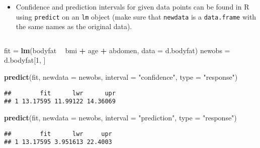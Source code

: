 \documentclass[10pt,ignorenonframetext,]{beamer}
\newenvironment{Shaded}{\begin{snugshade}}{\end{snugshade}}
\newcommand{\DataTypeTok}[1]{\textcolor[rgb]{0.13,0.29,0.53}{#1}}
\newcommand{\DecValTok}[1]{\textcolor[rgb]{0.00,0.00,0.81}{#1}}
\newcommand{\KeywordTok}[1]{\textcolor[rgb]{0.13,0.29,0.53}{\textbf{#1}}}
\newcommand{\NormalTok}[1]{#1}
\newcommand{\OperatorTok}[1]{\textcolor[rgb]{0.81,0.36,0.00}{\textbf{#1}}}
\newcommand{\StringTok}[1]{\textcolor[rgb]{0.31,0.60,0.02}{#1}}
\providecommand{\tightlist}{%
  \setlength{\itemsep}{0pt}\setlength{\parskip}{0pt}}
\begin{document}
\begin{frame}[fragile]

\begin{itemize}
\tightlist
\item
  Confidence and prediction intervals for given data points can be found
  in R using \texttt{predict} on an \texttt{lm} object (make sure that
  \texttt{newdata} is a \texttt{data.frame} with the same names as the
  original data).
\end{itemize}

\(~\)

\scriptsize

\begin{Shaded}
\begin{Highlighting}[]
\NormalTok{fit =}\StringTok{ }\KeywordTok{lm}\NormalTok{(bodyfat }\OperatorTok{~}\StringTok{ }\NormalTok{bmi }\OperatorTok{+}\StringTok{ }\NormalTok{age }\OperatorTok{+}\StringTok{ }\NormalTok{abdomen, }\DataTypeTok{data =}\NormalTok{ d.bodyfat)}
\NormalTok{newobs =}\StringTok{ }\NormalTok{d.bodyfat[}\DecValTok{1}\NormalTok{, ]}
\end{Highlighting}
\end{Shaded}

\begin{Shaded}
\begin{Highlighting}[]
\KeywordTok{predict}\NormalTok{(fit, }\DataTypeTok{newdata =}\NormalTok{ newobs, }\DataTypeTok{interval =} \StringTok{"confidence"}\NormalTok{, }\DataTypeTok{type =} \StringTok{"response"}\NormalTok{)}
\end{Highlighting}
\end{Shaded}

\begin{verbatim}
##        fit      lwr      upr
## 1 13.17595 11.99122 14.36069
\end{verbatim}

\begin{Shaded}
\begin{Highlighting}[]
\KeywordTok{predict}\NormalTok{(fit, }\DataTypeTok{newdata =}\NormalTok{ newobs, }\DataTypeTok{interval =} \StringTok{"prediction"}\NormalTok{, }\DataTypeTok{type =} \StringTok{"response"}\NormalTok{)}
\end{Highlighting}
\end{Shaded}

\begin{verbatim}
##        fit      lwr     upr
## 1 13.17595 3.951613 22.4003
\end{verbatim}

\end{frame}
\end{document}
